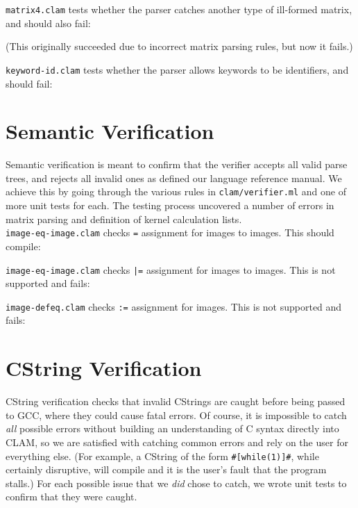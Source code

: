 \texttt{matrix4.clam} tests whether the parser catches another type of ill-formed matrix, and should also fail:

(This originally succeeded due to incorrect matrix parsing rules, but now it fails.)

\texttt{keyword-id.clam} tests whether the parser allows keywords to be identifiers, and should fail:



\section{Semantic Verification}
\label{testing:semantic}

Semantic verification is meant to confirm that the verifier accepts all valid parse trees,
and rejects all invalid ones as defined our language reference manual.
We achieve this by going through the various rules in \texttt{clam/verifier.ml}
and one of more unit tests for each. The testing process uncovered a number of errors
in matrix parsing and definition of kernel calculation lists.\\

\texttt{image-eq-image.clam} checks \texttt{=} assignment for images to images. This should compile:


\texttt{image-eq-image.clam} checks \texttt{|=} assignment for images to images. This is not supported and fails:


\texttt{image-defeq.clam} checks \texttt{:=} assignment for images. This is not supported and fails:


\section{CString Verification}
\label{testing:cstrings}

CString verification checks that invalid CStrings are caught before being passed to GCC, where they
could cause fatal errors. Of course, it is impossible to catch \emph{all} possible errors without
building an understanding of C syntax directly into CLAM, so we are satisfied with catching common
errors and rely on the user for everything else. (For example, a CString of the form \texttt{\#[while(1)]\#},
while certainly disruptive, will compile and it is the user's fault that the program stalls.)
For each possible issue that we \emph{did} chose to catch, we wrote unit tests to confirm that they were caught.\\




